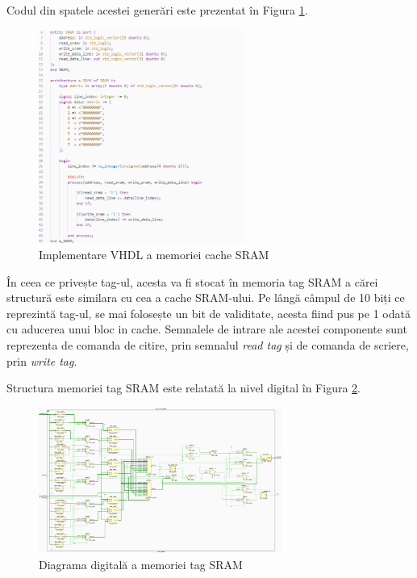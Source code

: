 \documentclass[12pt]{article}
\begin{document}
 Codul din spatele acestei generări este prezentat în Figura  \ref{Figura:56}.
  \begin{figure}[h!]
 \includegraphics[width=0.6\textwidth]{cachesramcode.png}
 \centering
 \caption{Implementare VHDL a memoriei cache SRAM}
 \label{Figura:56}
 \end{figure}

În ceea ce privește tag-ul, acesta va fi stocat în memoria tag SRAM a cărei structură este similara cu cea a cache SRAM-ului. Pe lângă câmpul de 10 biți ce reprezintă tag-ul, se mai folosește un bit de validitate, acesta fiind pus pe 1 odată cu aducerea unui bloc in cache. Semnalele de intrare ale acestei componente sunt reprezenta de comanda de citire, prin semnalul \textit{read tag} și de comanda de scriere, prin \textit{write tag}.

Structura memoriei tag SRAM este relatată la nivel digital în Figura \ref{Figura:57}.

  \begin{figure}[h!]
 \includegraphics[angle=-90,width=0.71\textwidth]{tagsram.png}
 \centering
 \caption{Diagrama digitală a memoriei tag SRAM}
 \label{Figura:57}
 \end{figure}
 
\end{document}
